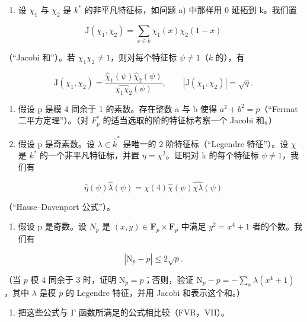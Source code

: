 \begin{enumerate}
\def\labelenumi{\alph{enumi})}
\setcounter{enumi}{2}
\tightlist
\item
  设 \(\chi_{1}\) 与 \(\chi_{2}\) 是 \(k^{*}\) 的非平凡特征标，如问题 a) 中那样用 0 延拓到 k。我们置
\end{enumerate}

\[
\mathrm{J} \left(\chi_ {1}, \chi_ {2}\right) = \sum_ {x \in k} \chi_ {1} (x) \chi_ {2} (1 - x)
\]

（“Jacobi 和”）。若 \(\chi_1\chi_2\neq 1\)，则对每个特征标 \(\psi \neq 1\)（\(k\) 的），有

\[
\mathrm{J} (\chi_ {1}, \chi_ {2}) = \frac {\widehat {\chi} _ {1} (\psi) \widehat {\chi} _ {2} (\psi)}{\widehat {\chi_ {1} \chi_ {2}} (\psi)}, \qquad | \mathrm{J} (\chi_ {1}, \chi_ {2}) | = \sqrt {q}.
\]

\begin{enumerate}
\def\labelenumi{\alph{enumi})}
\setcounter{enumi}{3}
\item
  假设 p 是模 4 同余于 1 的素数。存在整数 a 与 b 使得 \(a^{2} + b^{2} = p\)（“Fermat 二平方定理”）。（对 \(F_{p}^{*}\) 的适当选取的阶的特征标考察一个 Jacobi 和。）
\item
  假设 p 是奇素数。设 \(\lambda \in \widehat{k}^{*}\) 是唯一的 2 阶特征标（“Legendre 特征”）。设 \(\chi\) 是 \(k^{*}\) 的一个非平凡特征标，并置 \(\eta = \chi^{2}\)。证明对 k 的每个特征标 \(\psi \neq 1\)，我们有
\end{enumerate}

\[
\widehat {\eta} (\psi) \widehat {\lambda} (\psi) = \chi (4) \widehat {\chi} (\psi) \widehat {\chi \lambda} (\psi)
\]

（“Hasse–Davenport 公式”）。

\begin{enumerate}
\def\labelenumi{\alph{enumi})}
\setcounter{enumi}{5}
\tightlist
\item
  假设 p 是奇数。设 \(N_{p}\) 是 \((x,y)\in\mathbf{F}_{p}\times\mathbf{F}_{p}\) 中满足 \(y^{2}=x^{4}+1\) 者的个数。我们有
\end{enumerate}

\[
\left| \mathrm{N} _ {p} - p \right| \leqslant 2 \sqrt {p}.
\]

（当 \(p\) 模 4 同余于 3 时，证明 \(\mathrm{N}_p = p\)；否则，验证 \(\mathrm{N}_p - p = -\sum_x \lambda(x^4 + 1)\)，其中 \(\lambda\) 是模 \(p\) 的 Legendre 特征，并用 Jacobi 和表示这个和。）

\begin{enumerate}
\def\labelenumi{\alph{enumi})}
\setcounter{enumi}{6}
\tightlist
\item
  把这些公式与 Γ 函数所满足的公式相比较（FVR，VII）。
\end{enumerate}

